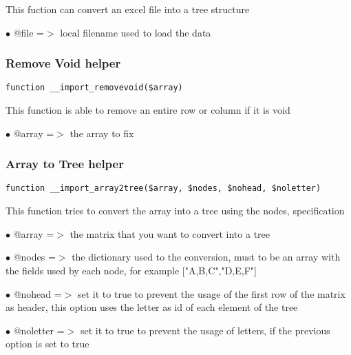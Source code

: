 \documentclass[a4paper]{article}
\begin{document}
This fuction can convert an excel file into a tree structure

\begin{compactitem}
\item[\color{myblue}$\bullet$] @file =$>$ local filename used to load the data
\end{compactitem}

\hypertarget{toc472}{}
\subsubsection{Remove Void helper}

\begin{lstlisting}
function __import_removevoid($array)
\end{lstlisting}

This function is able to remove an entire row or column if it is void

\begin{compactitem}
\item[\color{myblue}$\bullet$] @array =$>$ the array to fix
\end{compactitem}

\hypertarget{toc473}{}
\subsubsection{Array to Tree helper}

\begin{lstlisting}
function __import_array2tree($array, $nodes, $nohead, $noletter)
\end{lstlisting}

This function tries to convert the array into a tree using the nodes,
specification

\begin{compactitem}
\item[\color{myblue}$\bullet$] @array    =$>$ the matrix that you want to convert into a tree
\item[\color{myblue}$\bullet$] @nodes    =$>$ the dictionary used to the conversion, must to be an array with
             the fields used by each node, for example ["A,B,C","D,E,F"]
\item[\color{myblue}$\bullet$] @nohead   =$>$ set it to true to prevent the usage of the first row of the
             matrix as header, this option uses the letter as id of each
             element of the tree
\item[\color{myblue}$\bullet$] @noletter =$>$ set it to true to prevent the usage of letters, if the
             previous option is set to true
\end{compactitem}
\end{document}
